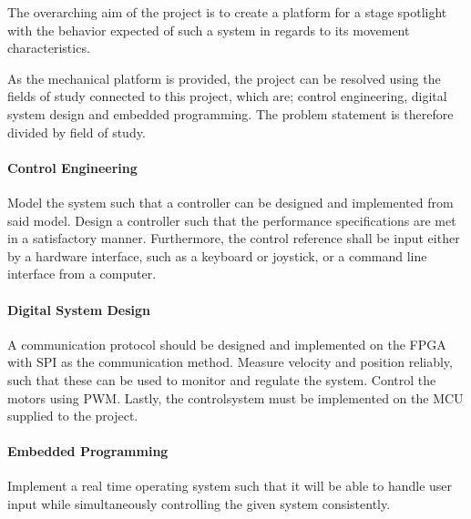 \documentclass[../../main]{subfiles}
\begin{document}
The overarching aim of the project is to create a platform for a stage spotlight with the behavior expected of such a system in regards to its movement characteristics.

As the mechanical platform is provided, the project can be resolved using the fields of study connected to this project, which are; control engineering, digital system design and embedded programming.
The problem statement is therefore divided by field of study.




\paragraph{Control Engineering}%
\label{par:control_engineering}
Model the system such that a controller can be designed and implemented from said model.
Design a controller such that the performance specifications are met in a satisfactory manner.
Furthermore, the control reference shall be input either by a hardware interface, such as a keyboard or joystick, or a command line interface from a computer.

\paragraph{Digital System Design}%
\label{par:digital_system_design}
A communication protocol should be designed and implemented on the FPGA with SPI as the communication method. 
Measure velocity and position reliably, such that these can be used to monitor and regulate the
system.
Control the motors using PWM. Lastly, the controlsystem must be implemented on the MCU supplied to the project.

\paragraph{Embedded Programming}%
\label{par:emebedded_programming}
Implement a real time operating system such that it will be able to handle user input while simultaneously controlling the given system consistently.
\\
\end{document}
